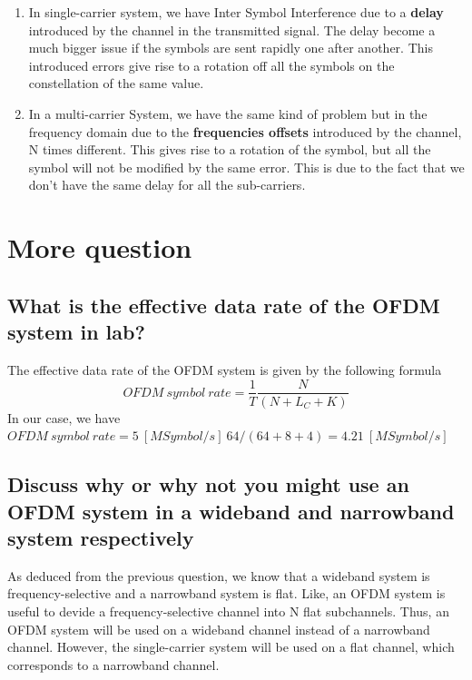 \documentclass[frenchb, oneside, headings=normal]{scrartcl}
\begin{document}
\begin{enumerate}
\item In single-carrier system, we have Inter Symbol Interference due to a \textbf{delay} introduced by the channel in the transmitted signal. The delay become a much bigger issue if the symbols are sent rapidly one after another. This introduced errors give rise to a rotation off all the symbols on the constellation of the same value.

\item In a multi-carrier System, we have the same kind of problem but in the frequency domain due to the \textbf{frequencies offsets} introduced by the channel, N times different. This gives rise to a rotation of the symbol, but all the symbol will not be modified by the same error. This is due to the fact that we don't have the same delay for all the sub-carriers.

\end{enumerate}

\section{More question}

\subsection{What is the effective data rate of the OFDM system in lab?}
The effective data rate of the OFDM system is given by the following formula
$$OFDM~symbol~rate = \frac{1}{T}\frac{N}{(N + L_C + K)} $$
In our case, we have $OFDM~symbol~rate = 5~[MSymbol/s]~{64}/{(64 + 8 + 4)} = 4.21~[MSymbol/s] $
\subsection{Discuss why or why not you might use an OFDM system in a wideband and narrowband system respectively}

As deduced from the previous question, we know that a wideband system is frequency-selective and a narrowband system is flat. Like, an OFDM system is useful to devide a frequency-selective channel into N flat subchannels. Thus, an OFDM system will be used on a wideband channel instead of a narrowband channel.
However, the single-carrier system will be used on a flat channel, which corresponds to a narrowband channel.
\end{document}
